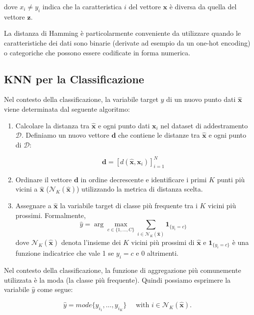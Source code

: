 dove $x_i \neq y_i$ indica che la caratteristica $i$ del vettore $\mathbf{x}$ è diversa da quella del vettore $\mathbf{z}$.

La distanza di Hamming è particolarmente conveniente da utilizzare quando le 
caratteristiche dei dati sono binarie (derivate ad esempio da un one-hot encoding) o categoriche 
che possono essere codificate in forma numerica.

\subsection{KNN per la Classificazione}

Nel contesto della classificazione, la variabile target \( \hat{y} \) di un nuovo punto dati \( \hat{\mathbf{x}} \) 
viene determinata dal seguente algoritmo:

\begin{enumerate}
    \item Calcolare la distanza tra \( \hat{\mathbf{x}} \) e ogni punto dati \( \mathbf{x}_i \) nel dataset 
    di addestramento \( \mathcal{D} \). Definiamo un nuovo vettore $\mathbf d$ che contiene le distanze 
    tra \( \hat{\mathbf{x}} \) e ogni punto di \(\mathcal{D}\):

    $$
    \mathbf d = [d(\hat{\mathbf{x}}, \mathbf{x}_i)]^N_{i=1}
    $$

    \item Ordinare il vettore $\mathbf d$ in ordine decrescente e identificare i primi \( K \) punti più vicini a 
    \( \hat{\mathbf{x}} \) ($\mathcal{N}_K(\hat{\mathbf{x}})$) utilizzando la metrica di distanza scelta.
    \item Assegnare a \( \hat{\mathbf{x}} \) la variabile target di classe più frequente tra i \( K \) vicini più prossimi. Formalmente,
    \[
    \hat{y} = \arg\max_{c \in \{1, \ldots, C\}} \sum_{i \in \mathcal{N}_K(\hat{\mathbf{x}})} \mathbf{1}_{\{y_i = c\}}
    \]
    dove \( \mathcal{N}_K(\hat{\mathbf{x}}) \) denota l'insieme dei \( K \) vicini più prossimi di \( \hat{\mathbf{x}} \) e \( \mathbf{1}_{\{y_i = c\}} \) è una funzione indicatrice che vale 1 se \( y_i = c \) e 0 altrimenti.
\end{enumerate}

Nel contesto della classificazione, la funzione di aggregazione più comunemente utilizzata è la moda 
(la classe più frequente). Quindi possiamo esprimere la variabile $\hat y$ come segue:

\[
\hat{y} = mode\{y_{i_1}, \ldots, y_{i_K}\} \quad \text{ with } i \in \mathcal{N}_K(\hat{\mathbf{x}}).
\]

